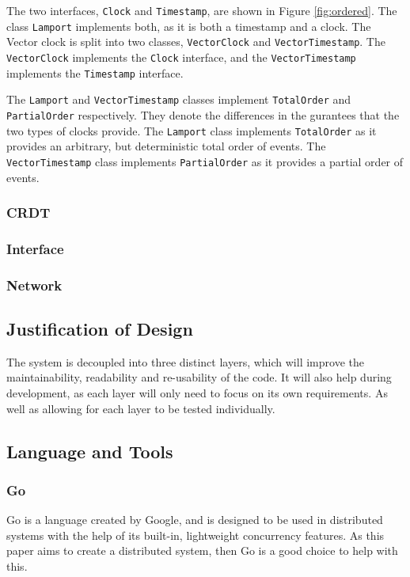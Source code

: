\documentclass[12pt]{article}
\begin{document}
The two interfaces, \texttt{Clock} and \texttt{Timestamp}, are shown in Figure \ref{fig:ordered}. The class \texttt{Lamport} implements both, as it is both a timestamp and a clock. The Vector clock is split into two classes, \texttt{VectorClock} and \texttt{VectorTimestamp}. The \texttt{VectorClock} implements the \texttt{Clock} interface, and the \texttt{VectorTimestamp} implements the \texttt{Timestamp} interface. \par

The \texttt{Lamport} and \texttt{VectorTimestamp} classes implement \texttt{TotalOrder} and \texttt{PartialOrder} respectively. They denote the differences in the gurantees that the two types of clocks provide. The \texttt{Lamport} class implements \texttt{TotalOrder} as it provides an arbitrary, but deterministic total order of events. The \texttt{VectorTimestamp} class implements \texttt{PartialOrder} as it provides a partial order of events. \par

\subsubsection{CRDT}

\subsubsection{Interface}

\subsubsection{Network}



\subsection{Justification of Design}
The system is decoupled into three distinct layers, which will improve the maintainability, readability and re-usability of the code. It will also help during development, as each layer will only need to focus on its own requirements. As well as allowing for each layer to be tested individually. \par

\subsection{Language and Tools}
\subsubsection{Go}
Go is a language created by Google, and is designed to be used in distributed systems with the help of its built-in, lightweight concurrency features. As this paper aims to create a distributed system, then Go is a good choice to help with this. \par
\end{document}
